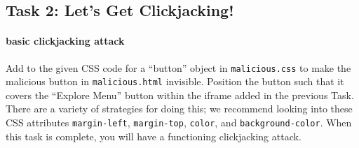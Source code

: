 
\subsection{Task 2: Let’s Get Clickjacking!}

\paragraph{basic clickjacking attack}
Add to the given CSS code for a ``button'' object in
\texttt{malicious.css} to make the malicious button in
\texttt{malicious.html} invisible. Position the button such that it
covers the ``Explore Menu'' button within the iframe added in the
previous Task. There are a variety of strategies for doing this; we
recommend looking into these CSS attributes \texttt{margin-left},
\texttt{margin-top}, \texttt{color}, and \texttt{background-color}. When
this task is complete, you will have a functioning clickjacking attack. 







